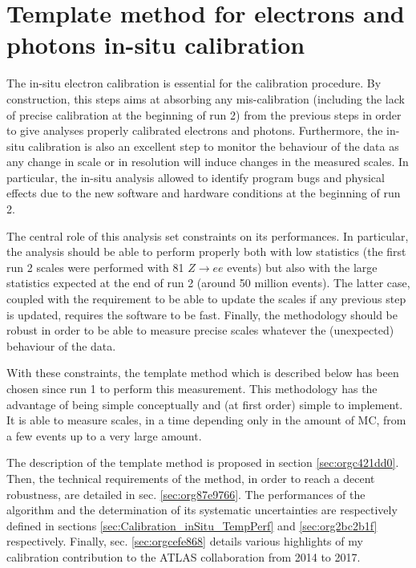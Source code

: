 \chapter{Template method for electrons and photons in-situ calibration}
\label{sec:orgfabb545}

The in-situ electron calibration is essential for the calibration procedure.
By construction, this steps aims at absorbing any mis-calibration (including the lack of precise calibration at the beginning of run 2) from the previous steps in order to give analyses properly calibrated electrons and photons.
Furthermore, the in-situ calibration is also an excellent step to monitor the behaviour of the data as any change in scale or in resolution will induce changes in the measured scales.
In particular, the in-situ analysis allowed to identify program bugs and physical effects due to the new software and hardware conditions at the beginning of run 2.

The central role of this analysis set constraints on its performances.
In particular, the analysis should be able to perform properly both with low statistics (the first run 2 scales were performed with 81 $Z\rightarrow ee$ events) but also with the large statistics expected at the end of run 2 (around 50 million events).
The latter case, coupled with the requirement to be able to update the scales if any previous step is updated, requires the software to be fast.
Finally, the methodology should be robust in order to be able to measure precise scales whatever the (unexpected) behaviour of the data.

With these constraints, the template method which is described below has been chosen since run 1 to perform this measurement.
This methodology has the advantage of being simple conceptually and (at first order) simple to implement.
It is able to measure scales, in a time depending only in the amount of MC, from a few events up to a very large amount.

The description of the template method is proposed in section \ref{sec:orgc421dd0}.
Then, the technical requirements of the method, in order to reach a decent robustness, are detailed in sec. \ref{sec:org87e9766}.
The performances of the algorithm and the determination of its systematic uncertainties are respectively defined in sections \ref{sec:Calibration_inSitu_TempPerf} and \ref{sec:org2bc2b1f} respectively.
Finally, sec. \ref{sec:orgcefe868} details various highlights of my calibration contribution to the ATLAS collaboration from 2014 to 2017.

